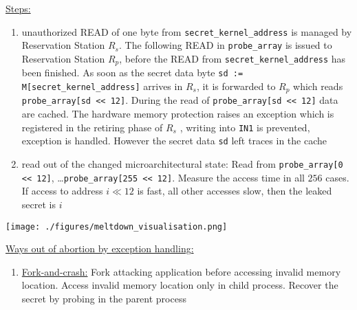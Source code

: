 \documentclass[landscape, a4paper]{article}
\begin{document}
\begin{minipage}[t]{0.2\pagewidth}
\begin{betterlist}
\begin{enumerate}
		\end{enumerate}
		\item \underline{Steps:}
		\begin{enumerate}
			\item unauthorized READ of one byte from \verb|secret_kernel_address| is managed by Reservation Station $R_s$. The following READ in \verb|probe_array| is issued to Reservation Station $R_p$, before the READ from \verb|secret_kernel_address| has been finished. As soon as the secret data byte \verb|sd := M[secret_kernel_address]| arrives in $R_s$, it is forwarded to $R_p$ which reads \verb|probe_array[sd << 12]|. During the read of \verb|probe_array[sd << 12]| data are cached. The hardware memory protection raises an exception which is registered in the retiring phase of $R_s$ , writing into \verb|IN1| is prevented, exception is handled. However the secret data \verb|sd| left traces in the cache
			\item read out of the changed microarchitectural state: Read from \verb|probe_array[0 << 12]|, \ldots \verb|probe_array[255 << 12]|. Measure the access time in all $256$ cases. If access to address $i \ll 12$ is fast, all other accesses slow, then the leaked secret is $i$
		\end{enumerate}
		\texttt{[image: ./figures/meltdown\_visualisation.png]}
		\item \underline{Ways out of abortion by exception handling:}
		\begin{enumerate}
			\item \underline{Fork-and-crash:} Fork attacking application before accessing invalid memory location. Access invalid memory location only in child process. Recover the secret by probing in the parent process

\end{enumerate}
\end{betterlist}
\end{minipage}
\end{document}
